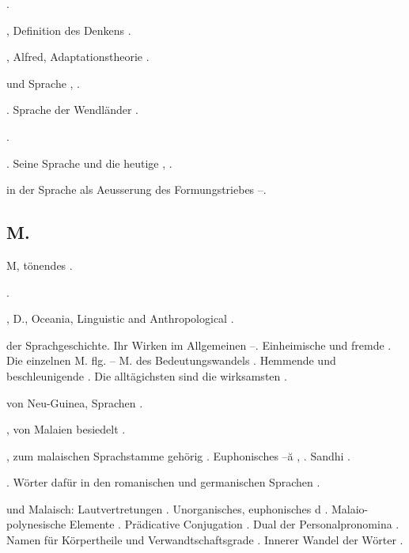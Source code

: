 \begin{register}
 \pageref{sp.282}.

, Definition des Denkens \pageref{sp.6}.

, Alfred, Adaptationstheorie \pageref{sp.180}.

 und Sprache \pageref{sp.309}, \pageref{sp.310}.


. Sprache der Wendländer \pageref{sp.146}.

 \pageref{sp.257}.

 \pageref{sp.46}. Seine Sprache und die heutige \pageref{sp.139}, \pageref{sp.271}.

 in der Sprache als Aeusserung des Formungstriebes \pageref{sp.361}–\pageref{sp.364}.


\subsection*{M.}\label{reg.M}

M, tönendes \pageref{sp.186}.

 \pageref{sp.282}.

, D., Oceania, Linguistic and Anthropological \pageref{sp.162}.

 der Sprachgeschichte. Ihr Wirken im Allgemeinen \pageref{sp.168}–\pageref{sp.169}. Einheimische und fremde \pageref{sp.177}. Die einzelnen M. \pageref{sp.181} flg. – M. des Bedeutungswandels \pageref{sp.232}. Hemmende und beschleunigende \pageref{sp.258}. Die alltäg\pageref{sp.1}ichsten sind die wirksamsten \pageref{sp.259}.

 von Neu-Guinea, Sprachen \pageref{sp.280}.

, von Malaien besiedelt \pageref{sp.147}.

, zum malaischen Sprachstamme gehörig \pageref{sp.26}. Euphonisches –ă \pageref{sp.157}, \pageref{sp.435}.  Sandhi \pageref{sp.198}.

. Wörter dafür in den romanischen und germanischen Sprachen \pageref{sp.153}.

 und Malaisch: Lautvertretungen \pageref{sp.158}. Unorganisches, euphonisches d \pageref{sp.201}. Malaio-polynesische Elemente \pageref{sp.280}. Prädicative Conjugation \pageref{sp.391}. Dual der Personalpronomina \pageref{sp.409}. Namen für Körpertheile und Verwandtschaftsgrade \pageref{sp.441}. Innerer Wandel der Wörter \pageref{sp.443}.


\end{register}
